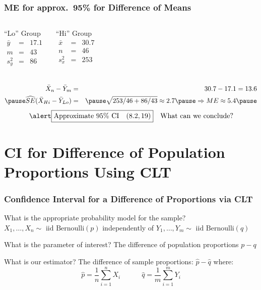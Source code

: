 \begin{frame}
\frametitle{ME for approx.\ 95\% for Difference of Means}

\small
\singlespacing
\begin{columns} 
	\begin{block}{``Lo'' Group}
		\begin{eqnarray*}
			\bar{y} &=&17.1 \\
			m &=& 43\\  
			s^2_{y} &=& 86\\ 
		\end{eqnarray*}
	\end{block}
	
		\begin{block}{``Hi'' Group}
		\begin{eqnarray*}
			\bar{x} &=& 30.7\\
			n &=& 46\\  
			s^2_{x} &=& 253\\
		\end{eqnarray*}
	\end{block}
\end{columns}

\pause
	\begin{eqnarray*}
		\bar{X}_{n} - \bar{Y}_{m} &=& 30.7 - 17.1 =  13.6\\ \pause
		\widehat{SE}(\bar{X}_{Hi} - \bar{Y}_{Lo}) &=& \pause \sqrt{253/46 + 86/43} \approx 2.7 \pause \Rightarrow ME \approx 5.4 \pause 
	\end{eqnarray*}
	$$\alert{\boxed{\mbox{Approximate 95\% CI} \quad (8.2, 19)}} \quad \mbox{What can we conclude?}$$


\end{frame}

\section{CI for Difference of Population Proportions Using CLT}
\begin{frame}
\frametitle{Confidence Interval for a Difference of Proportions via CLT}
	\begin{block}{What is the appropriate probability model for the sample?} 
$X_1, \hdots, X_n \sim \mbox{ iid Bernoulli}(p)$ independently  of $Y_1, \hdots, Y_m \sim \mbox{ iid Bernoulli}(q)$
\end{block}
	\begin{block}{What is the parameter of interest?}
The difference of population proportions $p - q$
\end{block}

\begin{block}{What is our estimator?}
The difference of sample proportions: $\widehat{p} - \widehat{q}$ where:
	$$\widehat{p} = \frac{1}{n}\sum_{i=1}^n X_i \quad \quad \quad	\widehat{q} = \frac{1}{m}\sum_{i=1}^m Y_i$$
\end{block}
\end{frame}

